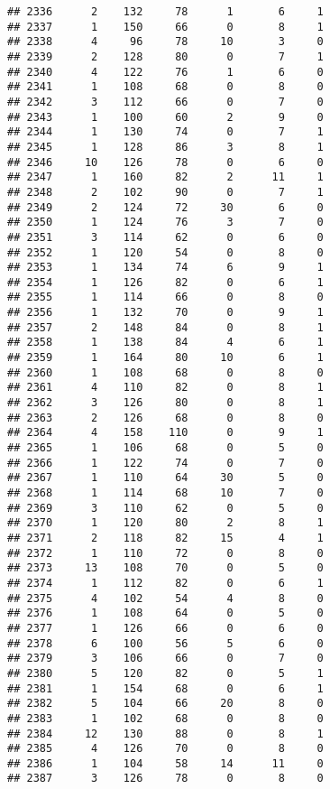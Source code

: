 \documentclass[
]{article}
\begin{document}
\begin{verbatim}
## 2336      2    132     78      1       6     1
## 2337      1    150     66      0       8     1
## 2338      4     96     78     10       3     0
## 2339      2    128     80      0       7     1
## 2340      4    122     76      1       6     0
## 2341      1    108     68      0       8     0
## 2342      3    112     66      0       7     0
## 2343      1    100     60      2       9     0
## 2344      1    130     74      0       7     1
## 2345      1    128     86      3       8     1
## 2346     10    126     78      0       6     0
## 2347      1    160     82      2      11     1
## 2348      2    102     90      0       7     1
## 2349      2    124     72     30       6     0
## 2350      1    124     76      3       7     0
## 2351      3    114     62      0       6     0
## 2352      1    120     54      0       8     0
## 2353      1    134     74      6       9     1
## 2354      1    126     82      0       6     1
## 2355      1    114     66      0       8     0
## 2356      1    132     70      0       9     1
## 2357      2    148     84      0       8     1
## 2358      1    138     84      4       6     1
## 2359      1    164     80     10       6     1
## 2360      1    108     68      0       8     0
## 2361      4    110     82      0       8     1
## 2362      3    126     80      0       8     1
## 2363      2    126     68      0       8     0
## 2364      4    158    110      0       9     1
## 2365      1    106     68      0       5     0
## 2366      1    122     74      0       7     0
## 2367      1    110     64     30       5     0
## 2368      1    114     68     10       7     0
## 2369      3    110     62      0       5     0
## 2370      1    120     80      2       8     1
## 2371      2    118     82     15       4     1
## 2372      1    110     72      0       8     0
## 2373     13    108     70      0       5     0
## 2374      1    112     82      0       6     1
## 2375      4    102     54      4       8     0
## 2376      1    108     64      0       5     0
## 2377      1    126     66      0       6     0
## 2378      6    100     56      5       6     0
## 2379      3    106     66      0       7     0
## 2380      5    120     82      0       5     1
## 2381      1    154     68      0       6     1
## 2382      5    104     66     20       8     0
## 2383      1    102     68      0       8     0
## 2384     12    130     88      0       8     1
## 2385      4    126     70      0       8     0
## 2386      1    104     58     14      11     0
## 2387      3    126     78      0       8     0

\end{verbatim}
\end{document}
